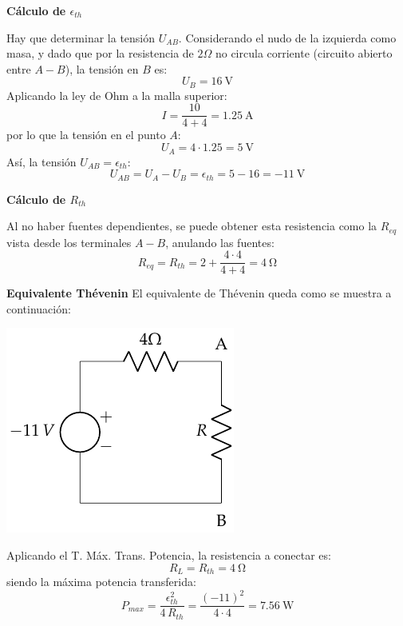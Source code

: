 \textbf{Cálculo de $\epsilon_{th}$}

Hay que determinar la tensión $U_{AB}$. Considerando el nudo de la
izquierda como masa, y dado que por la resistencia de $2\Omega$ no
circula corriente (circuito abierto entre $A-B$), la tensión en $B$
es:
\begin{equation*}
  U_B=\qty{16}{\volt}
\end{equation*}
Aplicando la ley de Ohm a la malla superior:
\begin{equation*}
  I=\dfrac{10}{4+4}=\qty{1.25}{\ampere}
\end{equation*}
por lo que la tensión en el punto $A$:
\begin{equation*}
  U_A=4\cdot 1.25=\qty{5}{\volt}
\end{equation*}
Así, la tensión $U_{AB}=\epsilon_{th}$:
\begin{equation*}
  U_{AB}=U_A-U_B=\epsilon_{th}=5-16=\qty{-11}{\volt}
\end{equation*}

\textbf{Cálculo de $R_{th}$}

Al no haber fuentes dependientes, se puede obtener esta resistencia
como la $R_{eq}$ vista desde los terminales $A-B$, anulando las
fuentes:
\begin{equation*}
  R_{eq}=R_{th}=2+\dfrac{4\cdot 4}{4+4}=\qty{4}{\ohm}
\end{equation*}

\textbf{Equivalente Thévenin} El equivalente de Thévenin queda como se
muestra a continuación:

\begin{center}
  \includegraphics{figuras/BT1_17_th.pdf}
\end{center}

Aplicando el T. Máx. Trans. Potencia, la resistencia a conectar es:
\begin{equation*}
  R_L=R_{th}=\qty{4}{\ohm}
\end{equation*}
siendo la máxima potencia transferida:
\begin{equation*}
  P_{max}=\dfrac{\epsilon_{th}^2}{4\,R_{th}}=\dfrac{(-11)^2}{4\cdot 4}=\qty{7.56}{\watt}
\end{equation*}

